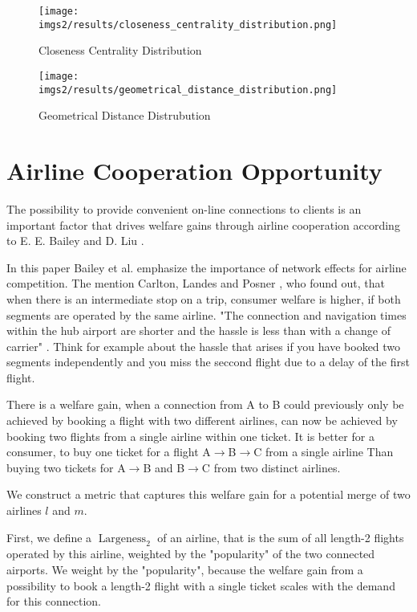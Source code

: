 \documentclass[twocolumn]{tum-article}
\DeclareMathOperator{\Largeness}{Largeness}
\begin{document}
\begin{figure}
        \centering
        \texttt{[image: imgs2/results/closeness\_centrality\_distribution.png]}
        \caption{
Closeness Centrality Distribution}
        \label{fig:closeness_distr}
\end{figure}


\begin{figure}
        \centering
        \texttt{[image: imgs2/results/geometrical\_distance\_distribution.png]}
        \caption{
Geometrical Distance Distrubution}
        \label{fig:geometric_distr}
\end{figure}

\section{Airline Cooperation Opportunity}

The possibility to provide convenient on-line connections to clients is an important factor that drives welfare gains through airline cooperation according to E. E. Bailey and D. Liu \cite{airline_consolidation_and_consumer_welfare}.

In this paper Bailey et al. emphasize the importance of network effects for airline competition. The mention Carlton, Landes and Posner \cite{costs-and-benefits-of-airline-mergers}, who found out, that when there is an intermediate stop on a trip, consumer welfare is higher, if both segments are operated by the same airline. 
"The connection and navigation times within the hub airport are shorter and the hassle is less than with a change of carrier" \cite{airline_consolidation_and_consumer_welfare}. 
Think for example about the hassle that arises if you have booked two segments independently and you miss the seccond flight due to a delay of the first flight. 

There is a welfare gain, when a connection from A to B could previously only be achieved by booking a flight with two different airlines, can now be achieved by booking two flights from a single airline within one ticket. 
It is better for a consumer, to buy one ticket for a flight \mbox{A$\rightarrow$B$\rightarrow$C} from a single airline 
Than buying two tickets for \mbox{A$\rightarrow$B} and \mbox{B$\rightarrow$C} from two distinct airlines.

We construct a metric that captures this welfare gain for a potential merge of two airlines $l$ and $m$. 

First, we define a $\Largeness_{2}$ of an airline, that is the sum of all length-2 flights operated by this airline, weighted by the "popularity" of the two connected airports.
We weight by the "popularity", because the welfare gain from a possibility to book a length-2 flight with a single ticket scales with the demand for this connection. 
\end{document}
